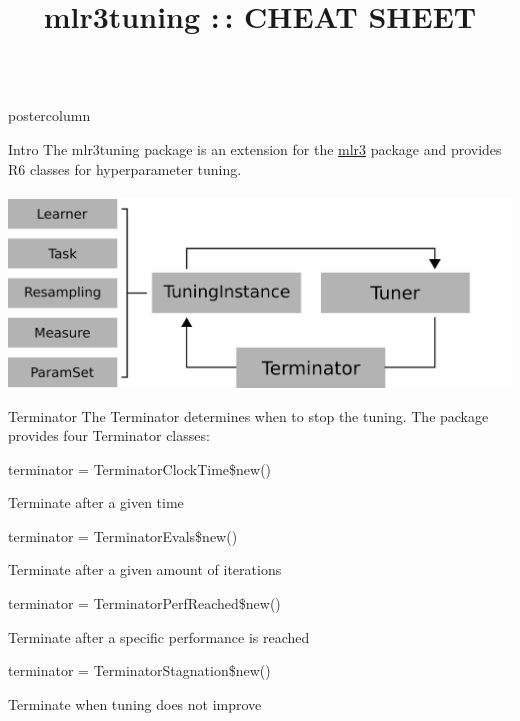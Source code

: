 \documentclass{beamer}
\title{mlr3tuning :\,: CHEAT SHEET} %
\newlength{\columnheight} %
\begin{document}
\begin{frame}[fragile]{}
	\begin{columns}
		\begin{column}{.245\textwidth}
			\begin{beamercolorbox}[center]{postercolumn}
				\begin{minipage}{.98\textwidth}
					\parbox[t][\columnheight]{\textwidth}{
						\begin{myblock}{Intro}
							The mlr3tuning package is an extension for the \href{https://github.com/mlr-org/mlr3}{mlr3} package and provides R6 classes for hyperparameter tuning.
							\\
							\\
							\includegraphics[width=\textwidth]{img/tuning_objects.png}
						\end{myblock}
					\begin{myblock}{Terminator}
						The Terminator determines when to stop the tuning. The package provides four Terminator classes:
						\\
						\begin{codebox}
							terminator = TerminatorClockTime\$new()
						\end{codebox}
						Terminate after a given time 
						\\
						\begin{codebox}
							terminator = TerminatorEvals\$new()
						\end{codebox}
						Terminate after a given amount of iterations 
						\\
						\begin{codebox}
							terminator = TerminatorPerfReached\$new()
						\end{codebox}
						Terminate after a specific performance is reached  
						\\
						\begin{codebox}
							terminator = TerminatorStagnation\$new()
						\end{codebox}
						Terminate when tuning does not improve

\end{myblock}}
\end{minipage}
\end{beamercolorbox}
\end{column}
\end{columns}
\end{frame}
\end{document}
